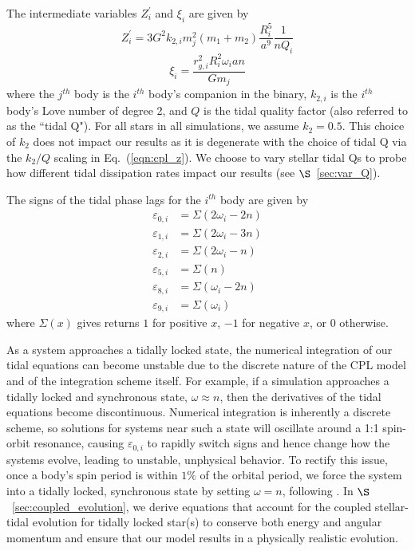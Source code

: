 The intermediate variables $Z_i^{'}$ and $\xi_i$ are given by
\begin{equation} \label{eqn:cpl_z}
Z_i^{'} = 3 G^2 k_{2,i} m_j^2 (m_1 + m_2) \frac{R_i^5}{a^9} \frac{1}{n Q_i}
\end{equation}
\begin{equation} \label{eqn:cpl_xi}
\xi_i = \frac{r_{g,i}^2 R_i^2 \omega_i a n}{G m_j}
\end{equation}
where the $j^{th}$ body is the $i^{th}$ body's companion in the binary, $k_{2,i}$ is the $i^{th}$ body's Love number of degree 2, and $Q$ is the tidal quality factor (also referred to as the ``tidal Q").  For all stars in all simulations, we assume $k_2 = 0.5$.  This choice of $k_2$ does not impact our results as it is degenerate with the choice of tidal Q via the $k_2/Q$ scaling in Eq.~(\ref{eqn:cpl_z}).  We choose to vary stellar tidal Qs to probe how different tidal dissipation rates impact our results (see $\S$~\ref{sec:var_Q}).

The signs of the tidal phase lags for the $i^{th}$ body are given by
\begin{equation} \label{eqn:cpl_eps}
\begin{split}
\varepsilon_{0,i} & = \Sigma(2 \omega_i - 2n) \\
\varepsilon_{1,i} & = \Sigma(2 \omega_i - 3n) \\
\varepsilon_{2,i} & = \Sigma(2 \omega_i - n) \\
\varepsilon_{5,i} & = \Sigma(n) \\
\varepsilon_{8,i} & = \Sigma(\omega_i - 2n) \\
\varepsilon_{9,i} & = \Sigma(\omega_i)
\end{split}
\end{equation}
where $\Sigma(x)$ gives returns $1$ for positive $x$, $-1$ for negative $x$, or $0$ otherwise.

As a system approaches a tidally locked state, the numerical integration of our tidal equations can become unstable due to the discrete nature of the CPL model and of the integration scheme itself.  For example, if a simulation approaches a tidally locked and synchronous state, $\omega \approx n$, then the derivatives of the tidal equations become discontinuous.  Numerical integration is inherently a discrete scheme, so solutions for systems near such a state will oscillate around a 1:1 spin-orbit resonance, causing $\varepsilon_{0,i}$ to rapidly switch signs and hence change how the systems evolve, leading to unstable, unphysical behavior.  To rectify this issue, once a body's spin period is within $1\%$ of the orbital period, we force the system into a tidally locked, synchronous state by setting $\omega = n$, following \citet{Barnes2013}.  In $\S$~\ref{sec:coupled_evolution}, we derive equations that account for the coupled stellar-tidal evolution for tidally locked star(s) to conserve both energy and angular momentum and ensure that our model results in a physically realistic evolution.

